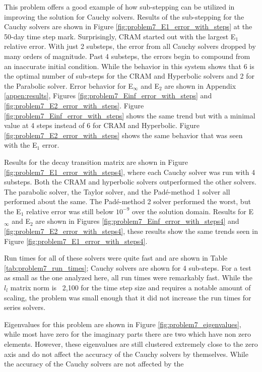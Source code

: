 This problem offers a good example of how sub-stepping can be utilized in improving the solution for Cauchy solvers.  Results of the sub-stepping for the Cauchy solvers are shown in Figure \ref{fig:problem7_E1_error_with_steps} at the 50-day time step mark. Surprisingly, CRAM started out with the largest E${}_{1}$ relative error. With just 2 substeps, the error from all Cauchy solvers dropped by many orders of magnitude. Past 4 substeps, the errors begin to compound from an inaccurate initial condition. While the behavior in this system shows that 6 is the optimal number of sub-steps for the CRAM and Hyperbolic solvers and 2 for the Parabolic solver. Error behavior for E${}_{\infty}$ and E${}_{2}$ are shown in Appendix \ref{appen:results}, Figures \ref{fig:problem7_Einf_error_with_steps} and \ref{fig:problem7_E2_error_with_steps}. Figure \ref{fig:problem7_Einf_error_with_steps} shows the same trend but with a minimal value at 4 steps instead of 6 for CRAM and Hyperbolic. Figure \ref{fig:problem7_E2_error_with_steps} shows the same behavior that was seen with the E${}_{1}$ error. 

Results for the decay transition matrix are shown in Figure \ref{fig:problem7_E1_error_with_steps4}, where each Cauchy solver was run with 4 substeps. Both the CRAM and hyperbolic solvers outperformed the other solvers. The parabolic solver, the Taylor solver, and the Pad\'e-method 1 solver all performed about the same. The Pad\'e-method 2 solver performed the worst, but the E${}_{1}$ relative error was still below $10^{-9}$ over the solution domain. Results for E${}_{\infty}$ and E${}_{2}$ are shown in Figures \ref{fig:problem7_Einf_error_with_steps4} and \ref{fig:problem7_E2_error_with_steps4}, these results show the same trends seen in Figure \ref{fig:problem7_E1_error_with_steps4}. 


Run times for all of these solvers were quite fast and are shown in Table \ref{tab:problem7_run_times}; Cauchy solvers are shown for 4 sub-steps. For a test as small as the one analyzed here, all run times were remarkably fast. While the $l_{l}$ matrix norm is ~2,100 for the time step size and requires a notable amount of scaling, the problem was small enough that it did not increase the run times for series solvers. 

Eigenvalues for this problem are shown in Figure \ref{fig:problem7_eigenvalues}, while most have zero for the imaginary parts there are two which have non zero elements. However, these eigenvalues are still clustered extremely close to the zero axis and do not affect the accuracy of the Cauchy solvers by themselves. While the accuracy of the Cauchy solvers are not affected by the 

